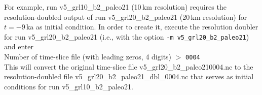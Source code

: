 \documentclass[12pt,a4paper]{article}
\begin{document}
For example, run v5\_grl10\_b2\_paleo21 (10\,km resolution) requires the resolution-doub\-led output of run v5\_grl20\_b2\_paleo21 (20\,km resolution) for $t=-9\,\mathrm{ka}$ as initial condition. In order to create it, execute the resolution doubler for run v5\_grl20\_\-b2\_paleo21 (i.e., with the option \verb+-m v5_grl20_b2_paleo21+) and enter
\\
\hspace*{10mm}Number of time-slice file (with leading zeros, 4 digits) $>$
\verb+0004+
\\
This will convert the original time-slice file v5\_grl20\_b2\_paleo210004.nc to the resolution-doubled file v5\_grl20\_b2\_paleo21\_dbl\_0004.nc that serves as initial conditions for run 
\linebreak{}
v5\_grl10\_b2\_paleo21.

\vfill
\end{document}
